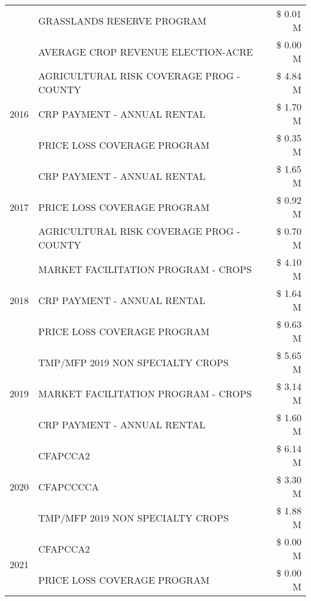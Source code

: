\begin{tabular}{llr}
 & GRASSLANDS RESERVE PROGRAM & \$ 0.01 M \\
 & AVERAGE CROP REVENUE ELECTION-ACRE & \$ 0.00 M \\
\cline{1-3}
\multirow[t]{3}{*}{2016} & AGRICULTURAL RISK COVERAGE PROG - COUNTY & \$ 4.84 M \\
 & CRP PAYMENT - ANNUAL RENTAL & \$ 1.70 M \\
 & PRICE LOSS COVERAGE PROGRAM & \$ 0.35 M \\
\cline{1-3}
\multirow[t]{3}{*}{2017} & CRP PAYMENT - ANNUAL RENTAL & \$ 1.65 M \\
 & PRICE LOSS COVERAGE PROGRAM & \$ 0.92 M \\
 & AGRICULTURAL RISK COVERAGE PROG - COUNTY & \$ 0.70 M \\
\cline{1-3}
\multirow[t]{3}{*}{2018} & MARKET FACILITATION PROGRAM - CROPS & \$ 4.10 M \\
 & CRP PAYMENT - ANNUAL RENTAL & \$ 1.64 M \\
 & PRICE LOSS COVERAGE PROGRAM & \$ 0.63 M \\
\cline{1-3}
\multirow[t]{3}{*}{2019} & TMP/MFP 2019 NON SPECIALTY CROPS & \$ 5.65 M \\
 & MARKET FACILITATION PROGRAM - CROPS & \$ 3.14 M \\
 & CRP PAYMENT - ANNUAL RENTAL & \$ 1.60 M \\
\cline{1-3}
\multirow[t]{3}{*}{2020} & CFAPCCA2 & \$ 6.14 M \\
 & CFAPCCCCA & \$ 3.30 M \\
 & TMP/MFP 2019 NON SPECIALTY CROPS & \$ 1.88 M \\
\cline{1-3}
\multirow[t]{2}{*}{2021} & CFAPCCA2 & \$ 0.00 M \\
 & PRICE LOSS COVERAGE PROGRAM & \$ 0.00 M \\
\cline{1-3}
\bottomrule
\end{tabular}
